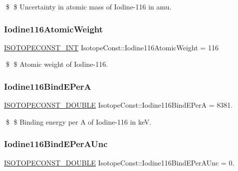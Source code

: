 \$ \$ Uncertainty in atomic mass of Iodine-\/116 in amu. \mbox{\label{group___isotope_const-_iodine-_i116_ga55cb1f2898c4976ccf15c8cb66ff96bd}} 
\subsubsection{\texorpdfstring{Iodine116\+Atomic\+Weight}{Iodine116AtomicWeight}}
{\footnotesize\ttfamily \mbox{\hyperlink{group___isotope_const-_macros_ga5f18360b3e99483a35c32d789e62621c}{I\+S\+O\+T\+O\+P\+E\+C\+O\+N\+S\+T\+\_\+\+I\+NT}} Isotope\+Const\+::\+Iodine116\+Atomic\+Weight = 116}

\$ \$ Atomic weight of Iodine-\/116. \mbox{\label{group___isotope_const-_iodine-_i116_gaaeadc37f4f6808a8c9ff8e4e81fe8ca2}} 
\subsubsection{\texorpdfstring{Iodine116\+Bind\+E\+PerA}{Iodine116BindEPerA}}
{\footnotesize\ttfamily \mbox{\hyperlink{group___isotope_const-_macros_ga8f45a7272ce02c0b4c65c44636ed719a}{I\+S\+O\+T\+O\+P\+E\+C\+O\+N\+S\+T\+\_\+\+D\+O\+U\+B\+LE}} Isotope\+Const\+::\+Iodine116\+Bind\+E\+PerA = 8381.}

\$ \$ Binding energy per A of Iodine-\/116 in keV. \mbox{\label{group___isotope_const-_iodine-_i116_ga22b1934d35d2fb12608e5ea97e9e5f47}} 
\subsubsection{\texorpdfstring{Iodine116\+Bind\+E\+Per\+A\+Unc}{Iodine116BindEPerAUnc}}
{\footnotesize\ttfamily \mbox{\hyperlink{group___isotope_const-_macros_ga8f45a7272ce02c0b4c65c44636ed719a}{I\+S\+O\+T\+O\+P\+E\+C\+O\+N\+S\+T\+\_\+\+D\+O\+U\+B\+LE}} Isotope\+Const\+::\+Iodine116\+Bind\+E\+Per\+A\+Unc = 0.}

